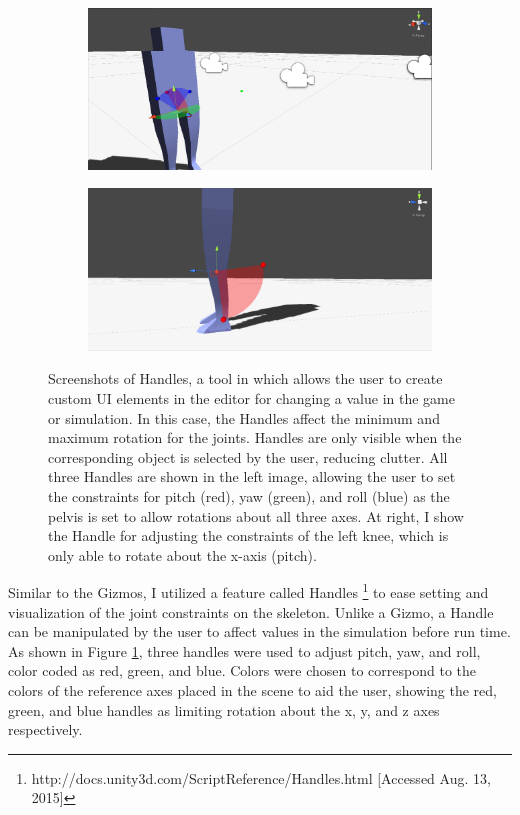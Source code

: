 \begin{figure}[ht]
	\centering
	\begin{subfigure}[b]{0.49\textwidth}
		\includegraphics[width=\textwidth]{images/handles1.png}
	\end{subfigure}
	\begin{subfigure}[b]{0.49\textwidth}
		\includegraphics[width=\textwidth]{images/handles2.png}
	\end{subfigure}
	\caption[Screenshot of Handles used for setting and visualizing joint constraints in \unity{}]{Screenshots of Handles, a tool in \unity{} which allows the user to create custom UI elements in the editor for changing a value in the game or simulation.  In this case, the Handles affect the minimum and maximum rotation for the joints.  Handles are only visible when the corresponding object is selected by the user, reducing clutter.  All three Handles are shown in the left image, allowing the user to set the constraints for pitch (red), yaw (green), and roll (blue) as the pelvis is set to allow rotations about all three axes.  At right, I show the Handle for adjusting the constraints of the left knee, which is only able to rotate about the x-axis (pitch).}
	\label{fig:handle_vis}
\end{figure}

Similar to the Gizmos, I utilized a feature called Handles \footnote{http://docs.unity3d.com/ScriptReference/Handles.html [Accessed Aug. 13, 2015]} to ease setting and visualization of the joint constraints on the skeleton.  Unlike a Gizmo, a Handle can be manipulated by the user to affect values in the simulation before run time.  As shown in Figure \ref{fig:handle_vis}, three handles were used to adjust pitch, yaw, and roll, color coded as red, green, and blue.  Colors were chosen to correspond to the colors of the reference axes placed in the scene to aid the user, showing the red, green, and blue handles as limiting rotation about the x, y, and z axes respectively.

